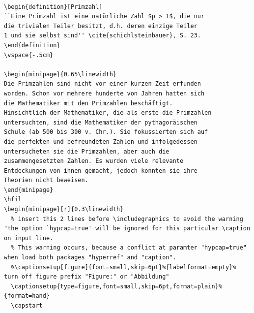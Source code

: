 \begin{lstlisting}

\begin{definition}[Primzahl]
``Eine Primzahl ist eine natürliche Zahl $p > 1$, die nur 
die trivialen Teiler besitzt, d.h. deren einzige Teiler
1 und sie selbst sind'' \cite{schichlsteinbauer}, S. 23.
\end{definition}
\vspace{-.5cm}

\begin{minipage}{0.65\linewidth}
Die Primzahlen sind nicht vor einer kurzen Zeit erfunden
worden. Schon vor mehrere hunderte von Jahren hatten sich
die Mathematiker mit den Primzahlen beschäftigt.
Hinsichtlich der Mathematiker, die als erste die Primzahlen
untersuchten, sind die Mathematiker der pythagoräischen
Schule (ab 500 bis 300 v. Chr.). Sie fokussierten sich auf
die perfekten und befreundeten Zahlen und infolgedessen
untersucheten sie die Primzahlen, aber auch die
zusammengesetzten Zahlen. Es wurden viele relevante
Entdeckungen von ihnen gemacht, jedoch konnten sie ihre
Theorien nicht beweisen.
\end{minipage}
\hfil
\begin{minipage}[r]{0.3\linewidth}
  % insert this 2 lines before \includegraphics to avoid the warning "the option `hypcap=true' will be ignored for this particular \caption on input line.
  % This warning occurs, because a conflict at paramter "hypcap=true" when load both packages "hyperref" and "caption".
  %\captionsetup[figure]{font=small,skip=6pt}%{labelformat=empty}% turn off figure prefix "Figure:" or "Abbildung"
  \captionsetup{type=figure,font=small,skip=6pt,format=plain}% {format=hand}
  \capstart

\end{lstlisting}
